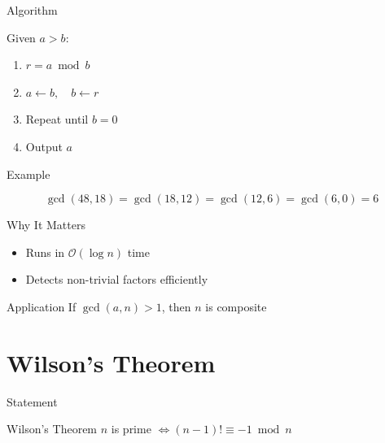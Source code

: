 \documentclass{beamer}
\newcommand{\bigO}{\mathcal{O}}
\begin{document}

\begin{frame}{Algorithm}

Given $a > b$:

\begin{enumerate}
    \item $r = a \bmod b$
    \item $a \leftarrow b,\quad b \leftarrow r$
    \item Repeat until $b = 0$
    \item Output $a$
\end{enumerate}

\end{frame}


\begin{frame}{Example}

\[
\gcd(48,18)
= \gcd(18,12)
= \gcd(12,6)
= \gcd(6,0)
= 6
\]

\end{frame}


\begin{frame}{Why It Matters}

\begin{itemize}
    \item Runs in $\bigO(\log n)$ time

    \item Detects non-trivial factors efficiently
\end{itemize}


\begin{block}{Application}
If $\gcd(a,n) > 1$, then $n$ is composite
\end{block}

\end{frame}

\section{Wilson's Theorem}

\begin{frame}{Statement}

\begin{block}{Wilson's Theorem}
$n$ is prime $\iff (n-1)! \equiv -1 \bmod n$
\end{block}

\end{frame}
\end{document}
